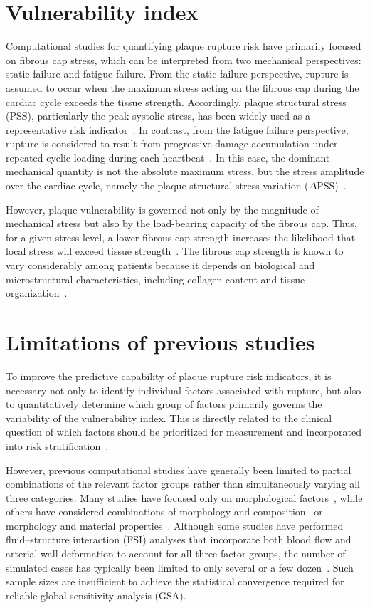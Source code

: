 \documentclass[master,english,final]{kaist-ucs}
\begin{document}
\section{Vulnerability index}
Computational studies for quantifying plaque rupture risk have primarily focused on fibrous cap stress, which can be interpreted from two mechanical perspectives: static failure and fatigue failure. From the static failure perspective, rupture is assumed to occur when the maximum stress acting on the fibrous cap during the cardiac cycle exceeds the tissue strength. Accordingly, plaque structural stress (PSS), particularly the peak systolic stress, has been widely used as a representative risk indicator~\cite{teng2014, huang2001}. In contrast, from the fatigue failure perspective, rupture is considered to result from progressive damage accumulation under repeated cyclic loading during each heartbeat~\cite{bank2000, versluis2006}. In this case, the dominant mechanical quantity is not the absolute maximum stress, but the stress amplitude over the cardiac cycle, namely the plaque structural stress variation ($\Delta$PSS)~\cite{costopoulos2017}.

However, plaque vulnerability is governed not only by the magnitude of mechanical stress but also by the load-bearing capacity of the fibrous cap. Thus, for a given stress level, a lower fibrous cap strength increases the likelihood that local stress will exceed tissue strength~\cite{corti2022, brown2016, gu2022}. The fibrous cap strength is known to vary considerably among patients because it depends on biological and microstructural characteristics, including collagen content and tissue organization~\cite{savvopoulos2024afm, chai2013}.

\section{Limitations of previous studies}
To improve the predictive capability of plaque rupture risk indicators, it is necessary not only to identify individual factors associated with rupture, but also to quantitatively determine which group of factors primarily governs the variability of the vulnerability index. This is directly related to the clinical question of which factors should be prioritized for measurement and incorporated into risk stratification~\cite{virmani2006, lee2019emerald, saltelli2008}.

However, previous computational studies have generally been limited to partial combinations of the relevant factor groups rather than simultaneously varying all three categories. Many studies have focused only on morphological factors~\cite{cilla2012}, while others have considered combinations of morphology and composition~\cite{costopoulos2017, teng2014, milzi2021} or morphology and material properties~\cite{polzer2019, stefanati2024}. Although some studies have performed fluid--structure interaction (FSI) analyses that incorporate both blood flow and arterial wall deformation to account for all three factor groups, the number of simulated cases has typically been limited to only several or a few dozen~\cite{zhao2024}. Such sample sizes are insufficient to achieve the statistical convergence required for reliable global sensitivity analysis (GSA).
\end{document}
